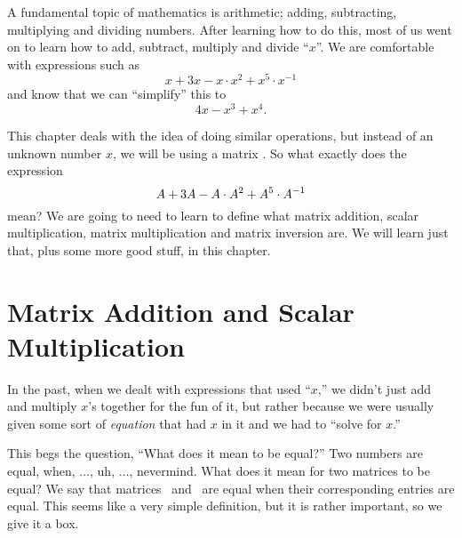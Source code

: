 A fundamental topic of mathematics is arithmetic; adding, subtracting, multiplying and dividing numbers. After learning how to do this, most of us went on to learn how to add, subtract, multiply and divide ``$x$''. We are comfortable with expressions such as $$x+3x-x\cdot x^2+x^5\cdot x^{-1}$$ and know that we can ``simplify'' this to $$4x-x^3+x^4.$$

This chapter deals with the idea of doing similar operations, but instead of an unknown number $x$, we will be using a matrix \tta. So what exactly does the expression $$A+3A-A\cdot A^2+A^5\cdot A^{-1}$$ mean? We are going to need to learn to define what matrix addition, scalar multiplication, matrix multiplication and matrix inversion are. We will learn just that, plus some more good stuff, in this chapter.

\section{Matrix Addition and Scalar Multiplication}\label{sec:matrix_arithmetic_1}


In the past, when we dealt with expressions that used ``$x$,'' we didn't just add and multiply $x$'s together for the fun of it, %
but rather because we were usually given some sort of \textit{equation} that had $x$ in it and we had to ``solve for $x$.''

This begs the question, ``What does it mean to be equal?'' Two numbers are equal, when, $\ldots$, uh, $\ldots$, nevermind. What does it mean for two matrices to be equal? We say that matrices \tta\ and \ttb\ are equal when their corresponding entries are equal. This seems like a very simple definition, but it is rather important, so we give it a box.

 


